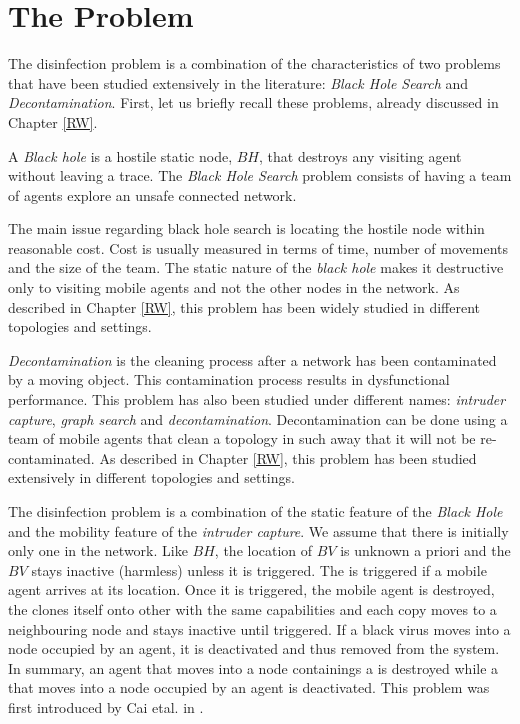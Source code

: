 \section{The Problem} 


 The \bv disinfection problem is a combination of the characteristics of two problems that have been studied extensively in the literature: {\it Black Hole Search} and {\it Decontamination}. First, let us briefly recall these problems, already discussed in Chapter \ref{RW}.


   A {\em Black hole} is a  hostile static node, $BH$, that destroys any visiting agent without leaving a trace.
The {\it Black Hole Search} problem consists of having a team of agents explore  an unsafe connected network.

The main issue regarding black hole search  is locating the hostile node within reasonable cost. Cost is usually measured in terms of time, number of movements and the size of the team. The static nature of the {\it black hole} makes it destructive only to visiting mobile agents and not the other nodes in the network. As described in Chapter \ref{RW}, this problem has been widely studied in different topologies and settings.

 
  {\it Decontamination} is the cleaning process after a network has been contaminated by a moving object.
This contamination process results in dysfunctional performance. This problem  has also been studied under different names: {\it intruder capture}, {\it graph search} and {\it decontamination}. Decontamination can be done using a team of mobile agents that clean a topology in such away that it will not be re-contaminated. As described in Chapter \ref{RW}, this problem has been studied extensively in different topologies and settings.

 
 The \bv disinfection problem is a combination of the static feature of the {\it Black Hole} and the mobility feature of the {\it intruder capture}. We assume that there is initially only one \bv in the network. Like $BH$, the location of $BV$ is unknown a priori and the $BV$  stays inactive (harmless) unless it is triggered.  
The \bv is triggered if a mobile agent arrives at its location. Once it is triggered, the mobile agent is destroyed, the \bv clones itself onto other \bvs with the same capabilities and each copy moves to a neighbouring node and stays inactive  until triggered. If a black virus moves into a node occupied by an agent, it is deactivated and thus removed from the system. In summary, an agent that moves into a node containings a  \bv is destroyed while a
  \bv that moves into a node occupied by an agent is deactivated. This problem was first introduced by Cai etal. in \cite{caietal18}.

